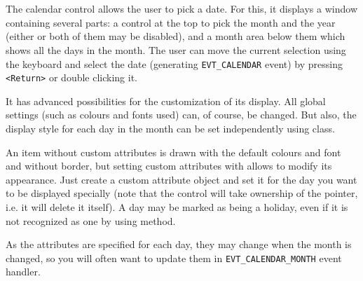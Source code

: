 
\section{}\label{wxcalendarctrl}

The calendar control allows the user to pick a date. For this,
it displays a window containing several parts: a control at the top to pick the month
and the year (either or both of them may be disabled), and a month
area below them which shows all the days in the month. The user can move the
current selection using the keyboard and select the date (generating 
{\tt EVT\_CALENDAR} event) by pressing {\tt <Return>} or double clicking it.

It has advanced possibilities for the customization of its display. All global
settings (such as colours and fonts used) can, of course, be changed. But
also, the display style for each day in the month can be set independently
using  class.

An item without custom attributes is drawn with the default colours and
font and without border, but setting custom attributes with 
 allows to modify its appearance. Just
create a custom attribute object and set it for the day you want to be
displayed specially (note that the control will take ownership of the pointer,
i.e. it will delete it itself). A day may be marked as being a holiday, even
if it is not recognized as one by  using 
 method.

As the attributes are specified for each day, they may change when the month
is changed, so you will often want to update them in 
{\tt EVT\_CALENDAR\_MONTH} event handler.


\\
\\
\\

